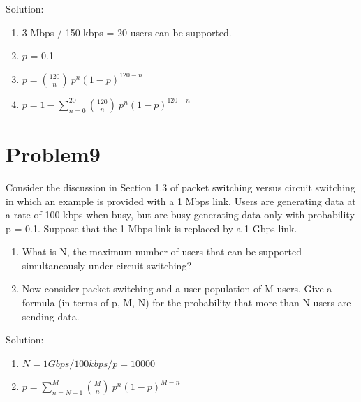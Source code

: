 \documentclass{article}
\begin{document}
  
  Solution: 
  \begin{enumerate}
  \item 3 Mbps / 150 kbps = 20 users can be supported.
  \item $p$ = 0.1
  \item $p = \binom{120}{n}\ p^n(1-p)^{120-n}$
  \item $p = 1 - \sum_{n=0}^{20} \binom{120}{n}\ p^n(1-p)^{120-n}$ 
  \end{enumerate}
\newpage
\section{Problem9} Consider the discussion in Section 1.3 of packet switching versus circuit switching in which an example is provided with a 1 Mbps link. Users are generating data at a rate of 100 kbps when busy, but are busy generating data only with probability p = 0.1. Suppose that the 1 Mbps link is replaced by a 1 Gbps link.
  \begin{enumerate}
  \item What is N, the maximum number of users that can be supported simultaneously under circuit switching?
  \item Now consider packet switching and a user population of M users. Give a formula (in terms of p, M, N) for the probability that more than N users are sending data.
  \end{enumerate}
  
  
  Solution: 
  \begin{enumerate}
  \item $N = 1Gbps / 100kbps / p = 10000$
  \item $p = \sum_{n=N+1}^{M} \binom{M}{n}\ p^n(1-p)^{M-n}$
  \end{enumerate}
\end{document}
